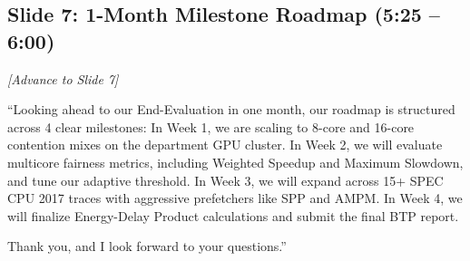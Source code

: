 \documentclass[11pt, a4paper]{article}
\begin{document}
\subsection{Slide 7: 1-Month Milestone Roadmap (5:25 -- 6:00)}
\textit{[Advance to Slide 7]}

``Looking ahead to our End-Evaluation in one month, our roadmap is structured across 4 clear milestones: In Week 1, we are scaling to 8-core and 16-core contention mixes on the department GPU cluster. In Week 2, we will evaluate multicore fairness metrics, including Weighted Speedup and Maximum Slowdown, and tune our adaptive threshold. In Week 3, we will expand across 15+ SPEC CPU 2017 traces with aggressive prefetchers like SPP and AMPM. In Week 4, we will finalize Energy-Delay Product calculations and submit the final BTP report. 

Thank you, and I look forward to your questions.''
\end{document}
